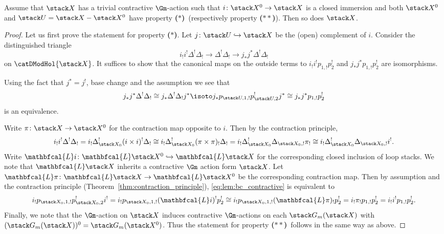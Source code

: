 \documentclass{ck-article}
\newcommand\bc{\textbf{($\mathbf{*}$)}}
\newcommand\hbc{\textbf{($\mathbf{**}$)}}
\renewcommand\ls[1]{\mathbfcal{L} #1}
\begin{document}
\begin{Prop}\label{prop:contractive}
    Assume that $\stack X$ has a trivial contractive $\Gm$-action such that $i\colon \stack X^0 \to \stack X$ is a closed immersion and both $\stack X^0$ and $\stack U = \stack X\setminus \stack X^0$ have property \bc\ (respectively property \hbc).
    Then so does $\stack X$.
\end{Prop}

\begin{proof}
    Let us first prove the statement for property \bc.
    Let $j\colon \stack U \hookrightarrow \stack X$ be the (open) complement of $i$.
    Consider the distinguished triangle
    \[
        i_!i^! \Delta^!\Delta_! \to \Delta^!\Delta_! \to j_*j^*\Delta^!\Delta_!
    \]
    on $\catDModHol{\stack X}$.
    It suffices to show that the canonical maps on the outside terms to $i_!i^! p_{1,!}p_2^!$ and $j_*j^* p_{1,!}p_2^!$ are isomorphisms.
    
    Using the fact that $j^* = j^!$, base change and the assumption we see that
    \[
        j_*j^*\Delta^!\Delta_! \cong
        j_*\Delta^!\Delta_!j^* \isoto
        j_*p_{\stack U,1,!}p_{\stack U,2}^! j^* \cong
        j_*j^* p_{1,!}p_2^!
    \]
    is an equivalence.

    Write $\pi\colon \stack X \to \stack X^0$ for the contraction map opposite to $i$.
    Then by the contraction principle,
    \begin{equation}\label{eq:lem:bc_contractive}
        i_!i^! \Delta^!\Delta_! =
        i_!\Delta_{\stack X_0}^!(i\times i)^! \Delta_! \cong
        i_!\Delta_{\stack X_0}^!(\pi\times \pi)_! \Delta_! =
        i_!\Delta_{\stack X_0}^!\Delta_{\stack X_0,!} \pi_! \cong
        i_!\Delta_{\stack X_0}^!\Delta_{\stack X_0,!} i^!.
    \end{equation}
    Write $\ls i \colon \ls\stack X^0 \hookrightarrow \ls\stack X$ for the corresponding closed inclusion of loop stacks.
    We note that $\ls\stack X$ inherits a contractive $\Gm$ action form $\stack X$.
    Let $\ls \pi\colon \ls\stack X \to \ls\stack X^0$ be the corresponding contraction map.
    Then by assumption and the contraction principle (Theorem~\ref{thm:contraction_principle}), \eqref{eq:lem:bc_contractive} is equivalent to
    \[
        i_!p_{\stack X_0,1,!}p_{\stack X_0,2}^! i^! =
        i_!p_{\stack X_0,1,!} (\ls i)^! p_{2}^! \cong
        i_!p_{\stack X_0,1,!} (\ls \pi)_! p_{2}^! =
        i_! \pi_! p_{1,!} p_{2}^! =
        i_! i^! p_{1,!} p_{2}^!.
    \]
    Finally, we note that the $\Gm$-action on $\stack X$ induces contractive $\Gm$-actions on each $\stack G_m(\stack X)$ with $(\stack G_m(\stack X))^0 = \stack G_m(\stack X^0)$.
    Thus the statement for property \hbc\ follows in the same way as above.
\end{proof}
\end{document}
